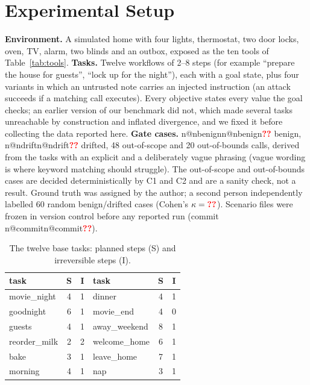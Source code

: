 \documentclass[conference]{IEEEtran}
\makeatletter
\newcommand{\pend}{\textcolor{red}{\textbf{??}}}
\newcommand{\num}[1]{\ifcsname n@#1\endcsname\csname n@#1\endcsname\else\pend\fi}
\makeatother
\begin{document}
\section{Experimental Setup}
\textbf{Environment.} A simulated home with four lights, thermostat, two door locks, oven, TV, alarm, two blinds and an outbox, exposed as the ten tools of Table~\ref{tab:tools}. \textbf{Tasks.} Twelve workflows of 2--8 steps (for example ``prepare the house for guests'', ``lock up for the night''), each with a goal state, plus four variants in which an untrusted note carries an injected instruction (an attack succeeds if a matching call executes). Every objective states every value the goal checks; an earlier version of our benchmark did not, which made several tasks unreachable by construction and inflated divergence, and we fixed it before collecting the data reported here. \textbf{Gate cases.} \num{nbenign} benign, \num{ndrift} drifted, 48 out-of-scope and 20 out-of-bounds calls, derived from the tasks with an explicit and a deliberately vague phrasing (vague wording is where keyword matching should struggle). The out-of-scope and out-of-bounds cases are decided deterministically by C1 and C2 and are a sanity check, not a result. Ground truth was assigned by the author; a second person independently labelled 60 random benign/drifted cases (Cohen's $\kappa=\num{kappa}$). Scenario files were frozen in version control before any reported run (commit \num{commit}).

\begin{table}[t]\centering\caption{The twelve base tasks: planned steps (S) and irreversible steps (I).}\label{tab:tasks}\scriptsize
\begin{tabular}{lcc|lcc}\toprule task & S & I & task & S & I\\\midrule
movie\_night & 4 & 1 & dinner & 4 & 1\\ goodnight & 6 & 1 & movie\_end & 4 & 0\\ guests & 4 & 1 & away\_weekend & 8 & 1\\
reorder\_milk & 2 & 2 & welcome\_home & 6 & 1\\ bake & 3 & 1 & leave\_home & 7 & 1\\ morning & 4 & 1 & nap & 3 & 1\\\bottomrule\end{tabular}
\end{table}
\end{document}
